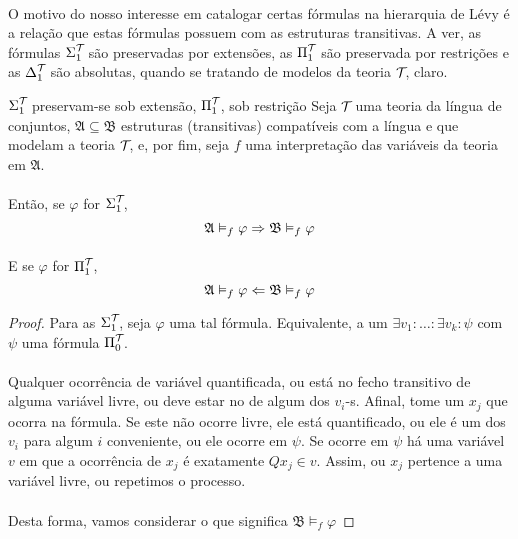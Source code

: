             \paragraph{}
                O motivo do nosso interesse em catalogar certas fórmulas na hierarquia de Lévy é a relação que 
                estas fórmulas possuem com as estruturas transitivas. A ver, as fórmulas 
                $\Sigma^{\mathcal{T}_{}}_{1}$ são preservadas por extensões, as $\Pi^{\mathcal{T}_{}}_{1}$ são 
                preservada por restrições e as $\Delta^{\mathcal{T}_{}}_{1}$ são absolutas, quando se tratando de 
                modelos da teoria $\mathcal{T}_{}$, claro.
            \begin{theorem}{$\Sigma^{\mathcal{T}_{}}_{1}$ preservam-se sob extensão, $\Pi^{\mathcal{T}_{}}_{1}$, sob restrição}
                    Seja $\mathcal{T}_{}$ uma teoria da língua de conjuntos, $\mathfrak{A}\subseteq\mathfrak{B}$ estruturas 
                    (transitivas) compatíveis com a língua e que modelam a teoria $\mathcal{T}_{}$, e, por fim, seja $f$ 
                    uma interpretação das variáveis da teoria em $\mathfrak{A}$.
                \paragraph{}
                    Então, se $\varphi$ for $\Sigma^{\mathcal{T}_{}}_{1}$,
                    $$ \mathfrak{A}\vDash_f \varphi \Rightarrow \mathfrak{B}\vDash_f \varphi $$
                \paragraph{}
                E se $\varphi$ for $\Pi^{\mathcal{T}_{}}_{1}$,
                $$ \mathfrak{A}\vDash_f \varphi \Leftarrow \mathfrak{B}\vDash_f \varphi $$
                \begin{proof}
                        Para as $\Sigma^{\mathcal{T}_{}}_{1}$, seja $\varphi$ uma tal fórmula. Equivalente, 
                        a um $\exists v_1:\ldots:\exists v_k:\psi$ com $\psi$ uma fórmula 
                        $\Pi^{\mathcal{T}_{}}_{0}$.
                    \paragraph{}
                        Qualquer ocorrência de variável quantificada, ou está no fecho transitivo de alguma 
                        variável livre, ou deve estar no de algum dos $v_i$-s. Afinal, tome um $x_j$ que 
                        ocorra na fórmula. Se este não ocorre livre, ele está quantificado, ou ele é um dos 
                        $v_i$ para algum $i$ conveniente, ou ele ocorre em $\psi$. Se ocorre em $\psi$ há 
                        uma variável $v$ em que a ocorrência de $x_j$ é exatamente $Q x_j\in v$. Assim, ou 
                        $x_j$ pertence a uma variável livre, ou repetimos o processo.
                    \paragraph{}
                        Desta forma, vamos considerar o que significa $\mathfrak{B}\vDash_f \varphi$
                \end{proof}
            \end{theorem}